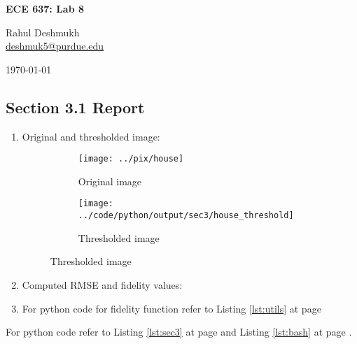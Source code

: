\documentclass[a4paper,11pt]{article}
\newcommand{\reflst}[1]{Listing \ref{#1} at page \pageref{#1}}
\begin{document}
\begin{center}
\Large{\textbf{ECE 637: Lab 8}}

Rahul Deshmukh\\\href{mailto:deshmuk5@purdue.edu}{{\color{blue}deshmuk5@purdue.edu}}

\today
\end{center}

\subsection*{Section 3.1 Report} 
\begin{enumerate}
\item Original and thresholded image:
\begin{figure}[!hp]
  \centering
   \begin{subfigure}{0.45\textwidth}
  \texttt{[image: ../pix/house]}
 \caption{Original image}
 \end{subfigure}
  \begin{subfigure}{0.45\textwidth}
  \texttt{[image: ../code/python/output/sec3/house\_threshold]}
 \caption{Thresholded image}
 \end{subfigure}
  
 \end{figure}
\item Computed RMSE and fidelity values:
    

\item For python code for fidelity function refer to \reflst{lst:utils}  
\end{enumerate}
 
For python code refer to \reflst{lst:sec3} and \reflst{lst:bash}.

\clearpage
\end{document}

